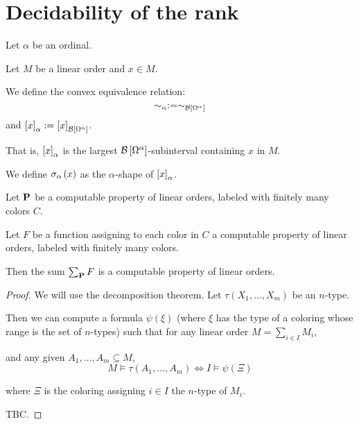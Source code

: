 \section{Decidability of the rank}

\begin{definition}
  Let $\alpha$ be an ordinal.

  Let $M$ be a linear order and $x \in M$.

  We define the convex equivalence relation:
  \[\sim_\alpha := \sim_{\mathcal{B} \left[ {{\Omega^{\alpha}}} \right]}\]
  and $\left[ {x} \right]_{\alpha} := \left[ {x} \right]_{\mathcal{B} \left[ {{\Omega^{\alpha}}} \right]}$.
  
  That is,
  $\left[ {x} \right]_{\alpha}$ is the largest $\mathcal{B} \left[ {{\Omega^{\alpha}}} \right]$-subinterval
  containing $x$ in $M$.

  We define $\sigma_{\alpha} \left( {x} \right)$ as
  the $\alpha$-shape of $\left[ {x} \right]_{\alpha}$.
\end{definition}

\begin{theorem}\label{computable-sum}
    Let $\mathbf{P}$ be a computable property of linear orders,
    labeled with finitely many colors $C$.

    Let $F$ be a function assigning
    to each color in $C$ a computable
    property of linear orders, labeled with
    finitely many colors.

    Then the sum $\sum_{\mathbf{P}}{F}$ is a computable
    property of linear orders.
\end{theorem}

\begin{proof}
    We will use the decomposition theorem.
    Let $\tau(X_1, \ldots, X_m)$ be an $n$-type.

    Then we can compute a formula $\psi(\xi)$ (where
    $\xi$ has the type of a coloring whose range is
    the set of $n$-types) such that
    for any linear order $M = \sum_{i \in I} M_i$,

    and any given $A_1, \ldots, A_m \subseteq M$,
    \[
        M \models \tau(A_1, \ldots, A_m)
        \iff I \models \psi(\Xi)
    \]

    where $\Xi$ is the coloring assigning $i \in I$ the $n$-type of $M_i$.

    TBC.
\end{proof}

